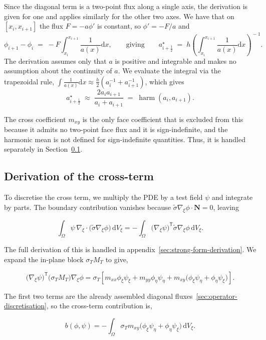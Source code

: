 \documentclass[final-report]{report-template}
\begin{document}
Since the diagonal term is a two-point flux along a single axis, the derivation is given for one and applies similarly for the other two axes. We have that on $[x_i,x_{i+1}]$ the flux $F=-a\phi'$ is constant, so $\phi'=-F/a$ and
\[
  \phi_{i+1}-\phi_i \;=\; -F\!\int_{x_i}^{x_{i+1}}\!\frac{1}{a(x)}\mathrm{d}x,
  \qquad\text{giving}\qquad
  a^{\star}_{i+\frac12}
  \;=\; h\left(\int_{x_i}^{x_{i+1}}\!\frac{1}{a(x)}\mathrm{d}x\right)^{\!-1}.
\]
The derivation assumes only that $a$ is positive and integrable and makes no assumption about the continuity of $a$. We evaluate the integral via the trapezoidal rule,
$\int \frac{1}{a(x)}\mathrm{d}x\approx\tfrac{h}{2}(a_i^{-1}+a_{i+1}^{-1})$, which gives
\[
  a^{\star}_{i+\frac12}\;\approx\;\frac{2a_ia_{i+1}}{a_i+a_{i+1}}
  \;=\;\operatorname{harm}(a_i,a_{i+1}).
\]

The cross coefficient $m_{xy}$ is the only face coefficient that is excluded from this because it admits no two-point
face flux and it is sign-indefinite, and the harmonic mean is not defined for sign-indefinite quantities. Thus, it is handled separately in Section~\ref{sec:cross-term}.

\subsection{Derivation of the cross-term}
\label{sec:cross-term}
To discretise the cross term, we multiply the PDE by a test field \(\psi\) and integrate by parts. The boundary contribution vanishes because \(\tilde{\sigma}\nabla_\xi\phi\cdot\mathbf N=0\), leaving

$$
\int_\Omega \psi\,\nabla_\xi\!\cdot\!\big(\tilde{\sigma}\nabla_\xi\phi\big)\,\mathrm dV_\xi
=
-\int_\Omega
\big(\nabla_\xi\psi\big)^{\mathsf T}
\tilde{\sigma}\nabla_\xi\phi\,\mathrm dV_\xi.
$$

The full derivation of this is handled in appendix~\ref{sec:strong-form-derivation}. We expand the in-plane block $\sigma_T M_T$ to give,

$$
\big(\nabla_\xi\psi\big)^{\mathsf T} \big(\sigma_T M_T\big)\nabla_\xi\phi = \sigma_T\left[ m_{xx}\phi_\xi\psi_\xi +m_{yy}\phi_\eta\psi_\eta +m_{xy}\big(\phi_\xi\psi_\eta+\phi_\eta\psi_\xi\big) \right].
$$

The first two terms are the already assembled diagonal fluxes~\ref{sec:operator-discretisation}, so the cross-term contribution is,

$$
b(\phi,\psi) = -\int_\Omega \sigma_Tm_{xy} \big(\phi_\xi\psi_\eta+\phi_\eta\psi_\xi\big) \,\mathrm dV_\xi.
$$
\end{document}
